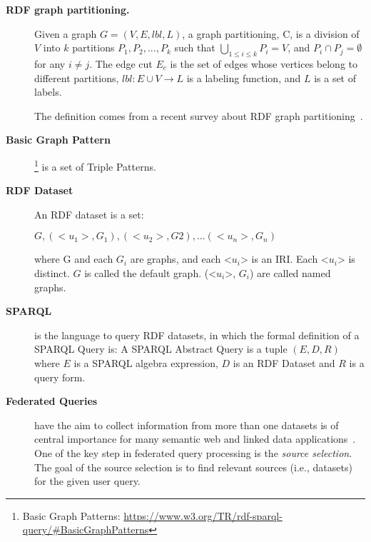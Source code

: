 \begin{description}
\item[\textbf{RDF graph partitioning.}]
Given a graph $G=(V,E, lbl, L)$, a graph partitioning, C, is a division of $V$ into $k$ partitions ${P_1,P_2,...,P_k}$ such that $\bigcup\limits_{1 \leq i \leq k}P_i=V$, and $P_i \cap P_j = \emptyset$ for any $i \neq j$. The edge cut $E_c$ is the set of edges whose vertices belong to different partitions, $lbl : E \cup V \rightarrow L$ is a labeling function, and $L$ is a set of labels. 

The definition comes from a recent survey about RDF graph partitioning~\cite{tomaszuk2015rdf}.

\item[\textbf{Basic Graph Pattern}]\footnote{Basic Graph Patterns: \url{https://www.w3.org/TR/rdf-sparql-query/\#BasicGraphPatterns}} is a set of Triple Patterns\cite{fletcher2008algebra}.

\item[\textbf{RDF Dataset}]
An RDF dataset is a set:

${ G, (<u_1>, G_1), (<u_2>, G2), . . . (<u_n>, G_n) }$

where G and each $G_i$ are graphs, and each <$u_i$> is an IRI. Each <$u_i$> is distinct. $G$ is called the default graph. (<$u_i$>, $G_i$) are called named graphs.

\item[\textbf{SPARQL}] is the language to query RDF datasets, in which the formal definition of a SPARQL Query is:
A SPARQL Abstract Query is a tuple $(E, D, R)$ where $E$ is a SPARQL algebra expression, $D$ is an RDF Dataset and $R$ is a query form.

\item[\textbf{Federated Queries}] have the aim to collect information from more than one datasets is of central importance for many semantic web and linked data applications~\cite{saleem2013fostering,bigtcga2014}. One of the key step in federated query processing is the \emph{source selection}. The goal of the source selection is to find relevant sources (i.e., datasets) for the given user query.

\end{description}